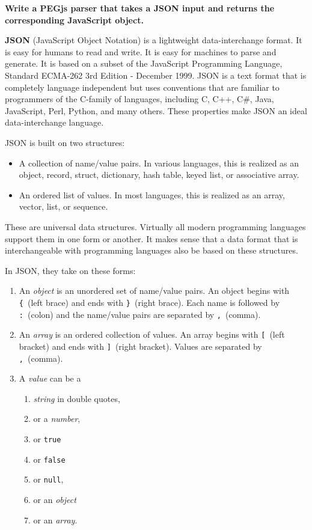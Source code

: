 \textbf{Write a PEGjs parser that takes a JSON input and returns the
corresponding JavaScript object.}

\textbf{JSON} (JavaScript Object Notation) is a lightweight
data-interchange format. It is easy for humans to read and write. It is
easy for machines to parse and generate. It is based on a subset of the
JavaScript Programming Language, Standard ECMA-262 3rd Edition -
December 1999. JSON is a text format that is completely language
independent but uses conventions that are familiar to programmers of the
C-family of languages, including C, C++, C\#, Java, JavaScript, Perl,
Python, and many others. These properties make JSON an ideal
data-interchange language.

JSON is built on two structures:

\begin{itemize}
\itemsep1pt\parskip0pt
\item
  A collection of name/value pairs. In various languages, this is
  realized as an object, record, struct, dictionary, hash table, keyed
  list, or associative array.
\item
  An ordered list of values. In most languages, this is realized as an
  array, vector, list, or sequence.
\end{itemize}

These are universal data structures. Virtually all modern programming
languages support them in one form or another. It makes sense that a
data format that is interchangeable with programming languages also be
based on these structures.

In JSON, they take on these forms:

\begin{enumerate}
\def\labelenumi{\arabic{enumi}.}
\item
  An \emph{object} is an unordered set of name/value pairs. An object
  begins with \texttt{\{}~(left brace) and ends with \texttt{\}}~(right
  brace). Each name is followed by \texttt{:}~(colon) and the name/value
  pairs are separated by \texttt{,}~(comma).
\item
  An \emph{array} is an ordered collection of values. An array begins
  with \texttt{{[}}~(left bracket) and ends with \texttt{{]}}~(right
  bracket). Values are separated by \texttt{,}~(comma).
\item
  A \emph{value} can be a

  \begin{enumerate}
  \def\labelenumii{\arabic{enumii}.}
  \itemsep1pt\parskip0pt
  \item
    \emph{string} in double quotes,
  \item
    or a \emph{number},
  \item
    or \texttt{true}
  \item
    or \texttt{false}
  \item
    or \texttt{null},
  \item
    or an \emph{object}
  \item
    or an \emph{array}.
  \end{enumerate}
\end{enumerate}


